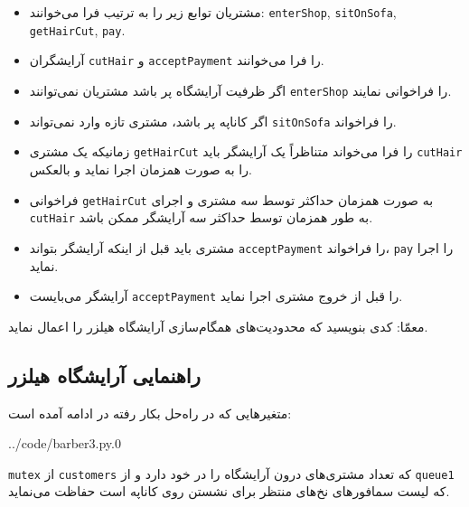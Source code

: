 \documentclass{book}
\begin{document}
\begin{itemize}

\item 
    مشتریان توابع زیر را به ترتیب فرا می‌خوانند:
{\tt enterShop}, {\tt sitOnSofa},
{\tt getHairCut}, {\tt pay}.   

\item 
    آرایشگران  {\tt cutHair} و {\tt acceptPayment} را فرا می‌خوانند. 

\item 
     اگر ظرفیت آرایشگاه پر باشد مشتریان نمی‌توانند {\tt enterShop}  را فراخوانی نمایند. 

\item 
    اگر کاناپه پر باشد، مشتری‌ تازه وارد نمی‌تواند {\tt sitOnSofa} را فراخواند. 

\item 
    زمانیکه یک مشتری {\tt getHairCut} را فرا می‌خواند متناظراً  یک آرایشگر باید {\tt cutHair} را به صورت همزمان اجرا نماید و بالعکس. 

\item 
    فراخوانی {\tt getHairCut} به صورت همزمان حداکثر توسط سه مشتری  و اجرای {\tt cutHair} به طور همزمان توسط حداکثر 
    سه آرایشگر  ممکن باشد.

\item 
    مشتری باید قبل از اینکه آرایشگر بتواند {\tt acceptPayment} را فراخواند،  {\tt pay}  را اجرا نماید. 

\item 
    آرایشگر می‌بایست  {\tt acceptPayment} را قبل از خروج مشتری  اجرا نماید. 

\end{itemize}

    معمّا: کدی بنویسید که محدودیت‌های همگام‌سازی آرایشگاه هیلزر را اعمال نماید. 


\subsection{راهنمایی آرایشگاه هیلزر}

    متغیرهایی که در راه‌حل بکار رفته در ادامه آمده است:‌

\begin{latin}

{../code/barber3.py.0}
\end{latin}

    {\tt mutex}
    از {\tt customers} که تعداد مشتری‌های درون آرایشگاه را در خود دارد و  از {\tt queue1} که لیست سمافورهای نخ‌های منتظر برای نشستن 
    روی کاناپه است حفاظت می‌نماید. 	
\end{document}
